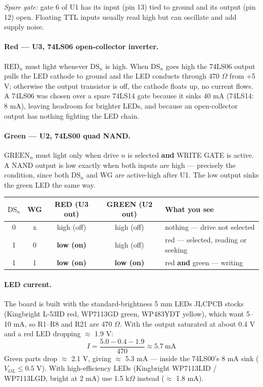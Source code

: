\documentclass[11pt,a4paper]{article}
\begin{document}
\emph{Spare gate:} gate 6 of U1 has its input (pin 13) tied to ground and its output (pin 12) open. Floating
TTL inputs usually read high but can oscillate and add supply noise.

\paragraph{Red --- U3, 74LS06 open-collector inverter.}
$\mathrm{RED}_n$ must light whenever $\mathrm{DS}_n$ is high. When $\mathrm{DS}_n$ goes high the 74LS06
output pulls the LED cathode to ground and the LED conducts through 470 $\Omega$ from +5 V; otherwise the
output transistor is off, the cathode floats up, no current flows. A 74LS06 was chosen over a spare 74LS14
gate because it sinks 40 mA (74LS14: 8 mA), leaving headroom for brighter LEDs, and because an open-collector
output has nothing fighting the LED chain.

\paragraph{Green --- U2, 74LS00 quad NAND.}
$\mathrm{GREEN}_n$ must light only when drive $n$ is selected \textbf{and} WRITE GATE is active. A NAND
output is low exactly when both inputs are high --- precisely the condition, since both $\mathrm{DS}_n$ and
WG are active-high after U1. The low output sinks the green LED the same way.

\begin{center}
\begin{tabular}{@{}cc|cc|l@{}}
\toprule
$\mathrm{DS}_n$ & WG & RED (U3 out) & GREEN (U2 out) & What you see\\
\midrule
0 & x & high (off) & high (off) & nothing --- drive not selected\\
1 & 0 & \textbf{low (on)} & high (off) & red --- selected, reading or seeking\\
1 & 1 & \textbf{low (on)} & \textbf{low (on)} & red \textbf{and} green --- writing\\
\bottomrule
\end{tabular}
\end{center}

\paragraph{LED current.}
The board is built with the standard-brightness 5 mm LEDs JLCPCB stocks (Kingbright L-53ID red, WP7113GD
green, WP483YDT yellow), which want 5--10 mA, so R1--R8 and R21 are 470 $\Omega$. With the output saturated
at about 0.4 V and a red LED dropping $\approx$ 1.9 V:
\[
I = \frac{5.0 - 0.4 - 1.9}{470} \approx 5.7\ \mathrm{mA}
\]
Green parts drop $\approx$ 2.1 V, giving $\approx$ 5.3 mA --- inside the 74LS00's 8 mA sink ($V_{OL} \le 0.5$ V).
With high-efficiency LEDs (Kingbright WP7113LID / WP7113LGD, bright at 2 mA) use 1.5 k$\Omega$ instead
($\approx$ 1.8 mA).
\end{document}
